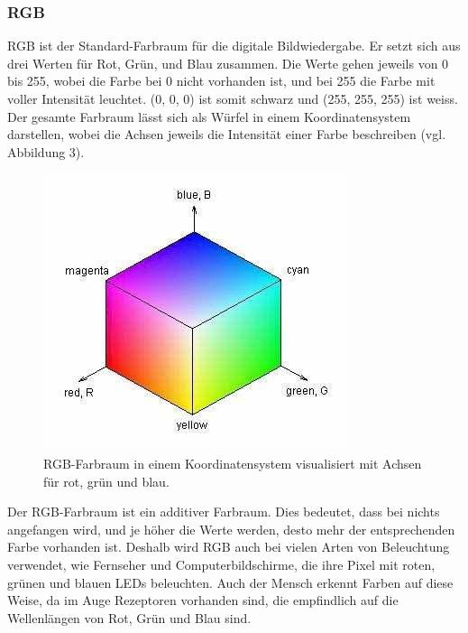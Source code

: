 \documentclass[a4paper, 12pt]{article}
\begin{document}
\subsubsection{RGB}
RGB ist der Standard-Farbraum für die digitale Bildwiedergabe. Er setzt sich aus drei Werten für Rot, Grün, und Blau zusammen. Die Werte gehen jeweils von 0 bis 255, wobei die Farbe bei 0 nicht vorhanden ist, und bei 255 die Farbe mit voller Intensität leuchtet. (0, 0, 0) ist somit schwarz und (255, 255, 255) ist weiss. Der gesamte Farbraum lässt sich als Würfel in einem Koordinatensystem darstellen, wobei die Achsen jeweils die Intensität einer Farbe beschreiben (vgl. Abbildung 3).
\begin{figure}[H]
\includegraphics[scale=0.5]{RGB_Wuerfel}
\caption{RGB-Farbraum in einem Koordinatensystem visualisiert mit Achsen für rot, grün und blau. \cite{RGBBild}}
\end{figure}
 Der RGB-Farbraum ist ein additiver Farbraum. Dies bedeutet, dass bei nichts angefangen wird, und je höher die Werte werden, desto mehr der entsprechenden Farbe vorhanden ist. \cite{RGBHSV} Deshalb wird RGB auch bei vielen Arten von Beleuchtung verwendet, wie Fernseher und Computerbildschirme, die ihre Pixel mit roten, grünen und blauen LEDs beleuchten. Auch der Mensch erkennt Farben auf diese Weise, da im Auge Rezeptoren vorhanden sind, die empfindlich auf die Wellenlängen von Rot, Grün und Blau sind.
\end{document}
